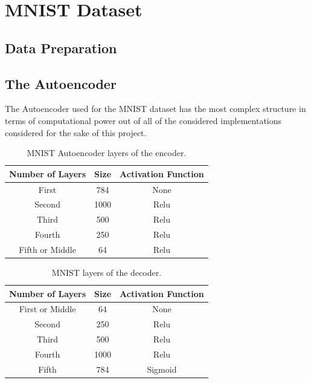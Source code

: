 \section{MNIST Dataset}
\subsection{Data Preparation}

\subsection{The Autoencoder}
The Autoencoder used for the MNIST dataset has the most complex structure in terms of computational power out of all of the considered implementations considered for the sake of this project. 

\begin{table}[H]
	\caption{MNIST Autoencoder layers of the encoder.}
	\begin{center}
		\label{tab:table_MNIST_auto_encoder}
		\begin{tabular}{c|c|c} %
			\textbf{Number of Layers} & \textbf{Size} & \textbf{Activation Function} \\
			\hline
			First & 784 & None\\
			Second & 1000 & Relu\\
			Third & 500  & Relu\\
			Fourth & 250 & Relu\\
			Fifth or Middle & 64 & Relu\\
		\end{tabular}
	\end{center}
\end{table}

\begin{table}[H]
	\caption{MNIST layers of the decoder.}
	\begin{center}
		\label{tab:table_MNIST_auto_decoder}
		\begin{tabular}{c|c|c} %
			\textbf{Number of Layers} & \textbf{Size} & \textbf{Activation Function} \\
			\hline
			First or Middle & 64 & None\\
			Second & 250 & Relu\\
			Third & 500  & Relu\\
			Fourth & 1000 & Relu\\
			Fifth & 784 & Sigmoid \\
		\end{tabular}
	\end{center}
\end{table}


